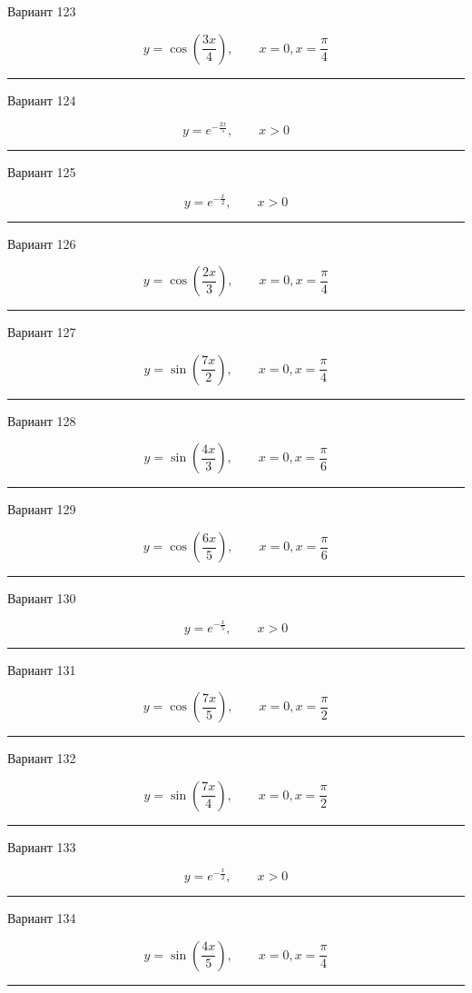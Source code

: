 \documentclass[11pt]{report}
\begin{document}
Вариант 123

$$y=\cos{\left(\frac{3 x}{4} \right)}, \qquad x = 0, x = \frac{\pi}{4}$$

\rule{\textwidth}{.2mm}

Вариант 124

$$y=e^{- \frac{2 x}{5}}, \qquad x > 0$$

\rule{\textwidth}{.2mm}

Вариант 125

$$y=e^{- \frac{x}{2}}, \qquad x > 0$$

\rule{\textwidth}{.2mm}

Вариант 126

$$y=\cos{\left(\frac{2 x}{3} \right)}, \qquad x = 0, x = \frac{\pi}{4}$$

\rule{\textwidth}{.2mm}

Вариант 127

$$y=\sin{\left(\frac{7 x}{2} \right)}, \qquad x = 0, x = \frac{\pi}{4}$$

\rule{\textwidth}{.2mm}

Вариант 128

$$y=\sin{\left(\frac{4 x}{3} \right)}, \qquad x = 0, x = \frac{\pi}{6}$$

\rule{\textwidth}{.2mm}

Вариант 129

$$y=\cos{\left(\frac{6 x}{5} \right)}, \qquad x = 0, x = \frac{\pi}{6}$$

\rule{\textwidth}{.2mm}

Вариант 130

$$y=e^{- \frac{x}{5}}, \qquad x > 0$$

\rule{\textwidth}{.2mm}

Вариант 131

$$y=\cos{\left(\frac{7 x}{5} \right)}, \qquad x = 0, x = \frac{\pi}{2}$$

\rule{\textwidth}{.2mm}

Вариант 132

$$y=\sin{\left(\frac{7 x}{4} \right)}, \qquad x = 0, x = \frac{\pi}{2}$$

\rule{\textwidth}{.2mm}

Вариант 133

$$y=e^{- \frac{x}{2}}, \qquad x > 0$$

\rule{\textwidth}{.2mm}

Вариант 134

$$y=\sin{\left(\frac{4 x}{5} \right)}, \qquad x = 0, x = \frac{\pi}{4}$$

\rule{\textwidth}{.2mm}
\end{document}
